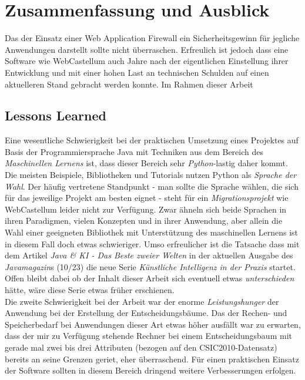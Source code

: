 \chapter{Zusammenfassung und Ausblick}



Das der Einsatz einer Web Application Firewall ein Sicherheitsgewinn für jegliche Anwendungen darstellt sollte nicht überraschen. Erfreulich ist jedoch dass eine Software wie WebCastellum auch Jahre nach der eigentlichen Einstellung ihrer Entwicklung und mit einer hohen Last an technischen Schulden auf einen aktuelleren Stand gebracht werden konnte. Im Rahmen dieser Arbeit 

\section{Lessons Learned}
Eine wesentliche Schwierigkeit bei der praktischen Umsetzung eines Projektes auf Basis der Programmiersprache Java mit Techniken aus dem Bereich des \emph{Maschinellen Lernens} ist, dass dieser Bereich sehr \glqq\emph{Python}\grqq-lastig daher kommt. Die meisten Beispiele, Bibliotheken und Tutorials nutzen Python als \emph{Sprache der Wahl}. Der häufig vertretene Standpunkt - man sollte die Sprache wählen, die sich für das jeweilige Projekt am besten eignet - steht für ein \emph{Migrationsprojekt} wie WebCastellum leider nicht zur Verfügung. Zwar ähneln sich beide Sprachen in ihren Paradigmen, vielen Konzepten und in ihrer Anwendung, aber allein die Wahl einer geeigneten Bibliothek mit Unterstützung des maschinellen Lernens ist in diesem Fall doch etwas schwieriger. Umso erfreulicher ist die Tatsache dass mit dem Artikel \glqq\emph{Java \& KI - Das Beste zweier Welten}\grqq{} in der aktuellen Ausgabe des \emph{Javamagazin}s (10/23) die neue Serie \glqq\emph{Künstliche Intelligenz in der Praxis}\grqq{} startet. Offen bleibt dabei ob der Inhalt dieser Arbeit sich eventuell etwas \emph{unterschieden} hätte, wäre diese Serie etwas früher erschienen.\\

Die zweite Schwierigkeit bei der Arbeit war der enorme \emph{Leistungshunger} der Anwendung bei der Erstellung der Entscheidungsbäume. Das der Rechen- und Speicherbedarf bei Anwendungen dieser Art etwas höher ausfällt war zu erwarten, dass der mir zu Verfügung stehende Rechner bei einem Entscheidungsbaum mit gerade mal zwei bis drei Attributen (bezogen auf den CSIC2010-Datensatz) bereits an seine Grenzen geriet, eher überraschend. Für einen praktischen Einsatz der Software sollten in diesem Bereich dringend weitere Verbesserungen erfolgen.

